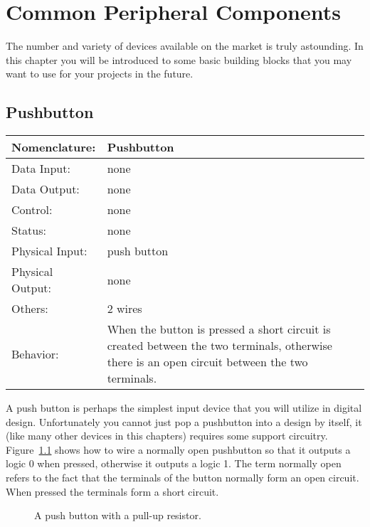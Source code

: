 \chapter{Common Peripheral Components}
\label{chapter:Common Peripheral Components}
\graphicspath{ {./chapter10/Fig} }

The number and variety of devices available on the market
is truly astounding.  In this chapter you will be introduced
to some basic building blocks that you may want to use for
your projects in the future.


\section{Pushbutton}
\label{page:pushbutton}
\begin{tabular}{|l|p{3.5in}|} \hline
Nomenclature:  & Pushbutton         \\ \hline
Data Input:    & none         \\ \hline
Data Output:   & none   \\ \hline
Control:       & none           \\ \hline
Status:        & none                                   \\ \hline
Physical Input:& push button		\\ \hline
Physical Output:& none		\\ \hline
Others:        & 2 wires             \\ \hline
Behavior:      & When the button is pressed a short circuit is created
between the two terminals, otherwise there is an open circuit between
the two terminals. \\ \hline
\end{tabular}

A push button is perhaps the simplest input device that you will
utilize in digital design.  Unfortunately you cannot just pop
a pushbutton into a design by itself, it (like many other devices
in this chapters) requires some support circuitry.  
Figure~\ref{fig:commonPeripheralComponentspushbutton} shows how to wire a normally open
pushbutton so that it outputs a logic 0 when pressed, otherwise 
it outputs a logic 1.  The term normally open refers to the fact
that the terminals of the button normally form an open circuit.
When pressed the terminals form a short circuit.

\begin{figure}[ht]
\caption{A push button with a pull-up resistor.}
\label{fig:commonPeripheralComponentspushbutton}
\end{figure}

